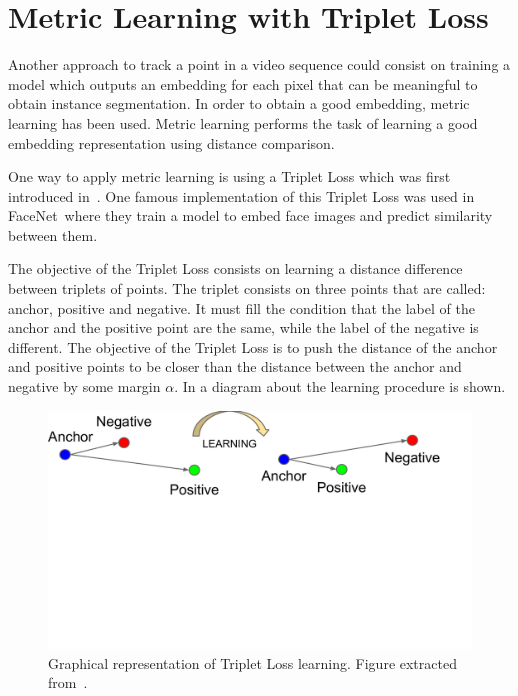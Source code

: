 \section{Metric Learning with Triplet Loss}
\label{sec:methods_metriclearning}

Another approach to track a point in a video sequence could consist on training a model which outputs an embedding for each pixel that can be meaningful to obtain instance segmentation.
In order to obtain a good embedding, metric learning has been used.
Metric learning performs the task of learning a good embedding representation using distance comparison.

One way to apply metric learning is using a Triplet Loss which was first introduced in~\metriclearning.
One famous implementation of this Triplet Loss was used in FaceNet~\facenet where they train a model to embed face images and predict similarity between them.

The objective of the Triplet Loss consists on learning a distance difference between triplets of points.
The triplet consists on three points that are called: anchor, positive and negative.
It must fill the condition that the label of the anchor and the positive point are the same, while the label of the negative is different.
The objective of the Triplet Loss is to push the distance of the anchor and positive points to be closer than the distance between the anchor and negative by some margin $\alpha$.
In  a diagram about the learning procedure is shown.

\begin{figure}[h]
  \centering
  \includegraphics[trim=1cm 10cm 2.5cm 0cm, width=0.7\linewidth]{figures/methods/triplet_loss/triplet_viz.pdf}
  \caption{
    Graphical representation of Triplet Loss learning.
    Figure extracted from~\cite{schroff2015facenet}. }
  \label{fig:triplet_loss_viz}
\end{figure}

